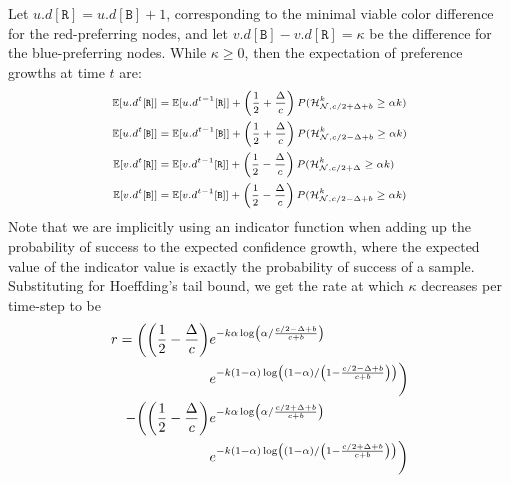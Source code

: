 \documentclass[letterpaper,twocolumn,10pt]{article}
\theoremstyle{definition}
\begin{document}
\begin{appendices}
{Let $u.d[\mathtt{R}] = u.d[\mathtt{B}] + 1$, corresponding to the minimal viable color difference for the red-preferring nodes, and let $v.d[\mathtt{B}] - v.d[\mathtt{R}] = \kappa$ be the difference for the blue-preferring nodes. While $\kappa \geq 0$, then the expectation of preference growths at time $t$ are:
\begin{equation}
    {\scriptsize
\begin{split}
    \mathbb{E}[{u.d}^t[\mathtt{R}]] &= \mathbb{E}[{u.d}^{t-1}[\mathtt{R}]] + \left(\frac{1}{2}+\frac{\Delta}{c}\right)P(\mathcal{H}_{\mathcal{N}, c/2 + \Delta + b}^k  \geq \alpha k)\\
    \mathbb{E}[{u.d}^t[\mathtt{B}]] &= \mathbb{E}[{u.d}^{t-1}[\mathtt{B}]] + \left(\frac{1}{2}+\frac{\Delta}{c}\right)P(\mathcal{H}_{\mathcal{N}, c/2 - \Delta + b}^k  \geq \alpha k)\\
    \mathbb{E}[{v.d}^t[\mathtt{R}]] &= \mathbb{E}[{v.d}^{t-1}[\mathtt{R}]] + \left(\frac{1}{2}-\frac{\Delta}{c}\right)P(\mathcal{H}_{\mathcal{N}, c/2 + \Delta}^k  \geq \alpha k)\\
    \mathbb{E}[{v.d}^t[\mathtt{B}]] &= \mathbb{E}[{v.d}^{t-1}[\mathtt{B}]] + \left(\frac{1}{2}-\frac{\Delta}{c}\right)P(\mathcal{H}_{\mathcal{N}, c/2 - \Delta + b}^k  \geq \alpha k)\\
\end{split}
    }
    \label{equation:expectation_snowball}
\end{equation}
Note that we are implicitly using an indicator function when adding up the probability of success to the expected confidence growth, where the expected value of the indicator value is exactly the probability of success of a sample. 
Substituting for Hoeffding's tail bound, we get the rate at which $\kappa$ decreases per time-step to be
\begin{equation}
    \begin{split}
    \small
        r = \biggl(\left(\frac{1}{2}-\frac{\Delta}{c}\right) &e^{-k\alpha \log \left(\alpha/\frac{c/2 - \Delta + b}{c+b}\right)}\\
    &e^{-k(1-\alpha) \log \left(\left(1-\alpha\right)/\left(1-\frac{c/2 - \Delta + b}{c+b}\right)\right)}\biggr)\\
        - \biggl(\left(\frac{1}{2}-\frac{\Delta}{c}\right)&e^{-k\alpha \log \left(\alpha/\frac{c/2 + \Delta + b}{c+b}\right)}\\
    &e^{-k(1-\alpha) \log \left(\left(1-\alpha\right)/\left(1-\frac{c/2 + \Delta + b}{c+b}\right)\right)}\biggr)\\
    \end{split}
    \label{equation:rate_decrease}
\end{equation}

}
\end{appendices}
\end{document}
